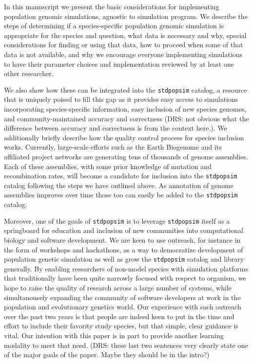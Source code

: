 \documentclass{article}
\newcommand{\stdpopsim}{\texttt{stdpopsim}\xspace}
\begin{document}
In this manuscript we present the basic considerations for implementing
population genomic simulations, agnostic to simulation program. We
describe the steps of determining if a species-specific population
genomic simulation is appropriate for the species and question, what
data is necessary and why, special considerations for finding or using
that data, how to proceed when some of that data is not available,
and why we encourage everyone implementing simulations to have their
parameter choices and implementation reviewed by at least one other
researcher.

We also show how these can be integrated into the \stdpopsim catalog, a
resource that is uniquely poised to fill this gap as it provides easy
access to simulations incorporating species-specific information,
easy inclusion of new species genomes, and community-maintained accuracy
and correctness (DRS: not obvious what the difference between accuracy
and correctness is from the context here.).
We additionally briefly describe how the quality control 
process for species inclusion works. Currently, large-scale efforts such as the Earth Biogenome
and its affiliated project networks are generating tens of thousands of genome
assemblies. Each of these assemblies, with some prior knowledge of mutation and
recombination rates, will become a candidate for inclusion into the
\stdpopsim catalog following the steps we have outlined above. As
annotation of genome assemblies improves over time those too can easily
be added to the \stdpopsim catalog.

Moreover, one of the goals of \stdpopsim is to leverage \stdpopsim itself
as a springboard for education and inclusion of new communities into
computational biology and software development. We are keen to use
outreach, for instance in the form of workshops and hackathons, as a way
to democratize development of population genetic simulation as well as
grow the \stdpopsim catalog and library generally. By enabling
researchers of non-model species with simulation platforms that
traditionally have been quite narrowly focused with respect to organism,
we hope to raise the quality of research across a large number of
systems, while simultanousely expanding the community of software
developers at work in the population and evolutionary genetics world.
Our experience with such outreach over the past two years is that people
are indeed keen to put in the time and effort to include their favority
study species, but that simple, clear guidance is vital. Our
intention with this paper is in part to provide another learning
modality to meet that need. (DRS: these last two sentences very
clearly state one of the major goals of the paper. Maybe they should be
in the intro?)
\end{document}
